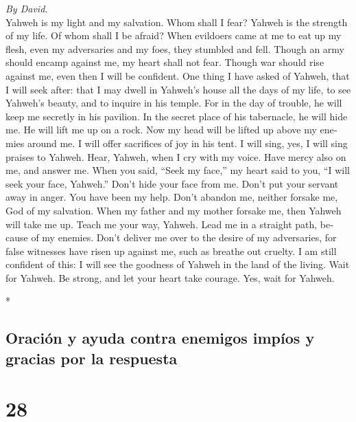\begin{paracol}{2}
\begin{otherlanguage}{english}
\emph{By David.}\\
 Yahweh is my light and my salvation. Whom shall I fear?
Yahweh is the strength of my life. Of whom shall I be afraid?
 When evildoers came at me to eat up my flesh, even my
adversaries and my foes, they stumbled and fell.  Though
an army should encamp against me, my heart shall not fear. Though war
should rise against me, even then I will be confident. 
One thing I have asked of Yahweh, that I will seek after: that I may
dwell in Yahweh's house all the days of my life, to see Yahweh's beauty,
and to inquire in his temple.  For in the day of trouble,
he will keep me secretly in his pavilion. In the secret place of his
tabernacle, he will hide me. He will lift me up on a rock.
 Now my head will be lifted up above my enemies around me.
I will offer sacrifices of joy in his tent. I will sing, yes, I will
sing praises to Yahweh.  Hear, Yahweh, when I cry with my
voice. Have mercy also on me, and answer me.  When you
said, ``Seek my face,'' my heart said to you, ``I will seek your face,
Yahweh.''  Don't hide your face from me. Don't put your
servant away in anger. You have been my help. Don't abandon me, neither
forsake me, God of my salvation.  When my father and my
mother forsake me, then Yahweh will take me up.  Teach me
your way, Yahweh. Lead me in a straight path, because of my enemies.
 Don't deliver me over to the desire of my adversaries,
for false witnesses have risen up against me, such as breathe out
cruelty.  I am still confident of this: I will see the
goodness of Yahweh in the land of the living.  Wait for
Yahweh. Be strong, and let your heart take courage. Yes, wait for
Yahweh.

\end{otherlanguage}

\switchcolumn[0]*

\hypertarget{oraciuxf3n-y-ayuda-contra-enemigos-impuxedos-y-gracias-por-la-respuesta}{%
\subsection{Oración y ayuda contra enemigos impíos y gracias por la
respuesta}\label{oraciuxf3n-y-ayuda-contra-enemigos-impuxedos-y-gracias-por-la-respuesta}}

\hypertarget{section-54}{%
\section{28}\label{section-54}}


\end{paracol}
